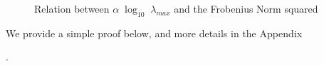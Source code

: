 { \begin{figure}[!htb]
    \centering
        \caption{Relation between $\alpha\;\log_{10}\;\lambda_{max}$ and the Frobenius Norm squared }
    \label{fig:relations}
\end{figure}




We provide a simple proof below, and more details in the Appendix}.


